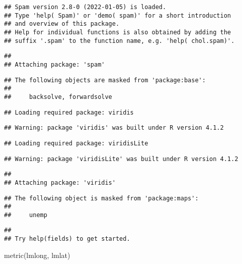 \documentclass[
]{article}
\newenvironment{Shaded}{\begin{snugshade}}{\end{snugshade}}
\newcommand{\FunctionTok}[1]{\textcolor[rgb]{0.00,0.00,0.00}{#1}}
\newcommand{\NormalTok}[1]{#1}
\begin{document}
\begin{verbatim}
## Spam version 2.8-0 (2022-01-05) is loaded.
## Type 'help( Spam)' or 'demo( spam)' for a short introduction 
## and overview of this package.
## Help for individual functions is also obtained by adding the
## suffix '.spam' to the function name, e.g. 'help( chol.spam)'.
\end{verbatim}

\begin{verbatim}
## 
## Attaching package: 'spam'
\end{verbatim}

\begin{verbatim}
## The following objects are masked from 'package:base':
## 
##     backsolve, forwardsolve
\end{verbatim}

\begin{verbatim}
## Loading required package: viridis
\end{verbatim}

\begin{verbatim}
## Warning: package 'viridis' was built under R version 4.1.2
\end{verbatim}

\begin{verbatim}
## Loading required package: viridisLite
\end{verbatim}

\begin{verbatim}
## Warning: package 'viridisLite' was built under R version 4.1.2
\end{verbatim}

\begin{verbatim}
## 
## Attaching package: 'viridis'
\end{verbatim}

\begin{verbatim}
## The following object is masked from 'package:maps':
## 
##     unemp
\end{verbatim}

\begin{verbatim}
## 
## Try help(fields) to get started.
\end{verbatim}

\begin{Shaded}
\begin{Highlighting}[]
\FunctionTok{metric}\NormalTok{(lmlong, lmlat)}
\end{Highlighting}
\end{Shaded}
\end{document}
